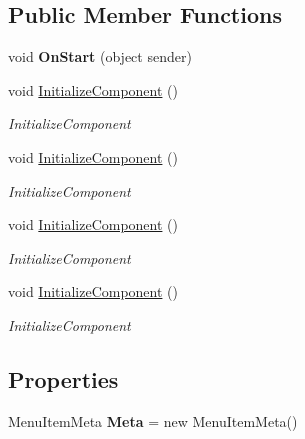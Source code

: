 \subsection*{Public Member Functions}
\begin{DoxyCompactItemize}
\item 
\mbox{\label{class_teacher_handbook_1_1_plugins_1_1_feed_1_1_page_af4dfd254ebcefdb19462957b7ae01abc}} 
void {\bfseries On\+Start} (object sender)
\item 
void \mbox{\hyperlink{class_teacher_handbook_1_1_plugins_1_1_feed_1_1_page_a6ed1347e26e2ed603972b1d6627b8d56}{Initialize\+Component}} ()
\begin{DoxyCompactList}\small\item\em Initialize\+Component \end{DoxyCompactList}\item 
void \mbox{\hyperlink{class_teacher_handbook_1_1_plugins_1_1_feed_1_1_page_a6ed1347e26e2ed603972b1d6627b8d56}{Initialize\+Component}} ()
\begin{DoxyCompactList}\small\item\em Initialize\+Component \end{DoxyCompactList}\item 
void \mbox{\hyperlink{class_teacher_handbook_1_1_plugins_1_1_feed_1_1_page_a6ed1347e26e2ed603972b1d6627b8d56}{Initialize\+Component}} ()
\begin{DoxyCompactList}\small\item\em Initialize\+Component \end{DoxyCompactList}\item 
void \mbox{\hyperlink{class_teacher_handbook_1_1_plugins_1_1_feed_1_1_page_a6ed1347e26e2ed603972b1d6627b8d56}{Initialize\+Component}} ()
\begin{DoxyCompactList}\small\item\em Initialize\+Component \end{DoxyCompactList}\end{DoxyCompactItemize}
\subsection*{Properties}
\begin{DoxyCompactItemize}
\item 
\mbox{\label{class_teacher_handbook_1_1_plugins_1_1_feed_1_1_page_ae379e753495615436874deae2c4dca8c}} 
Menu\+Item\+Meta {\bfseries Meta} = new Menu\+Item\+Meta()
\end{DoxyCompactItemize}
